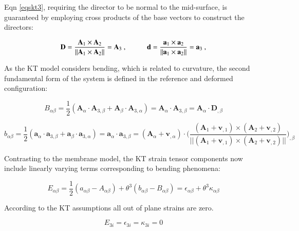 Eqn \eqref{eqskt3}, requiring the director to be normal to the mid-surface, is guaranteed by employing cross products of the base vectors to construct the directors:

\begin{equation} 
\mathbf{D} = \frac{\mathbf{A}_1 \times \mathbf{A}_2}
{\lvert \lvert \mathbf{A}_1 \times \mathbf{A}_2 \rvert \rvert}
= \mathbf{A}_3\ ,
\hspace{10mm}
\mathbf{d} = \frac{\mathbf{a}_1 \times \mathbf{a}_2}
{\lvert \lvert \mathbf{a}_1 \times \mathbf{a}_2 \rvert \rvert}
= \mathbf{a}_3\ ,
\label{eqskt5}
\end{equation}

As the KT model considers bending, which is related to curvature, the second fundamental form of the system is defined in the reference and deformed configuration:

\begin{equation} 
B_{\alpha \beta} = \frac{1}{2} 
( 
\mathbf{A}_\alpha \cdot \mathbf{A}_{3,\beta} 
+
\mathbf{A}_\beta \cdot \mathbf{A}_{3,\alpha}
)
=
\mathbf{A}_\alpha \cdot \mathbf{A}_{3,\beta}
=
\mathbf{A}_\alpha \cdot \mathbf{D}_{,\beta}
\label{eqskt6}
\end{equation}

\begin{equation} 
b_{\alpha \beta} = \frac{1}{2} 
( 
\mathbf{a}_\alpha \cdot \mathbf{a}_{3,\beta} 
+
\mathbf{a}_\beta \cdot \mathbf{a}_{3,\alpha}
)
=
\mathbf{a}_\alpha \cdot \mathbf{a}_{3,\beta}
=
(\mathbf{A}_\alpha + \mathbf{v}_{,\alpha}) 
\cdot 
\Bigg({
	\frac{    (\mathbf{A}_1 + \mathbf{v}_{,1})  \times (\mathbf{A}_2 + \mathbf{v}_{,2})    }
	{\lvert \lvert  (\mathbf{A}_1 + \mathbf{v}_{,1})  \times (\mathbf{A}_2 + \mathbf{v}_{,2})   \rvert \rvert}
}\Bigg)_{,\beta}
\label{eqskt7}
\end{equation}

Contrasting to the membrane model, the KT strain tensor components now include linearly varying terms corresponding to bending phenomena:

\begin{equation} 
E_{\alpha \beta}
= \frac{1}{2}
(a_{\alpha\beta} - A_{\alpha\beta})
+
\theta^3 (b_{\alpha\beta} - B_{\alpha\beta})
=
\epsilon_{\alpha \beta} + \theta^3 \kappa_{\alpha \beta}
\label{eqskt8}
\end{equation}

According to the KT assumptions all out of plane strains are zero.

\begin{equation} 
E_{3i} = \epsilon_{3i} = \kappa_{3i} = 0
\label{eqskt81}
\end{equation}

